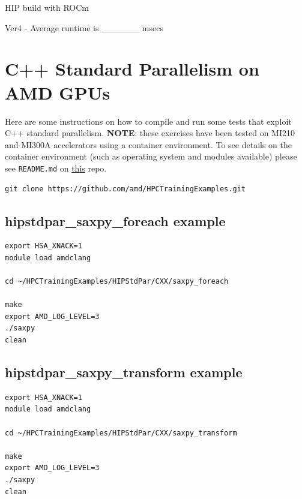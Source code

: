 \documentclass[
]{article}
\let\oldtexttt\texttt
\renewcommand{\texttt}[1]{
  \colorbox{Light}{\oldtexttt{#1}}
}
\begin{document}
HIP build with ROCm

Ver4 - Average runtime is \_\_\_\_\_\_ msecs

\pagebreak

\hypertarget{c-standard-parallelism-on-amd-gpus}{%
\section{C++ Standard Parallelism on AMD
GPUs}\label{c-standard-parallelism-on-amd-gpus}}

Here are some instructions on how to compile and run some tests that
exploit C++ standard parallelism. \textbf{NOTE}: these exercises have
been tested on MI210 and MI300A accelerators using a container
environment. To see details on the container environment (such as
operating system and modules available) please see \texttt{README.md} on
\href{https://github.com/amd/HPCTrainingDock}{this} repo.

\begin{verbatim}
git clone https://github.com/amd/HPCTrainingExamples.git
\end{verbatim}

\hypertarget{hipstdpar_saxpy_foreach-example}{%
\subsection{hipstdpar\_saxpy\_foreach
example}\label{hipstdpar_saxpy_foreach-example}}

\begin{verbatim}
export HSA_XNACK=1
module load amdclang

cd ~/HPCTrainingExamples/HIPStdPar/CXX/saxpy_foreach

make
export AMD_LOG_LEVEL=3
./saxpy
clean
\end{verbatim}

\hypertarget{hipstdpar_saxpy_transform-example}{%
\subsection{hipstdpar\_saxpy\_transform
example}\label{hipstdpar_saxpy_transform-example}}

\begin{verbatim}
export HSA_XNACK=1
module load amdclang

cd ~/HPCTrainingExamples/HIPStdPar/CXX/saxpy_transform

make
export AMD_LOG_LEVEL=3
./saxpy
clean
\end{verbatim}
\end{document}
